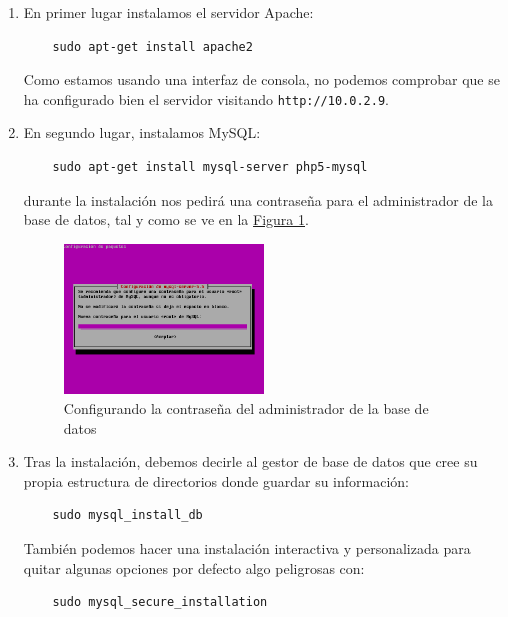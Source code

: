 \documentclass[10pt,a4paper,spanish]{article}
\numberwithin{equation}{section} %
\numberwithin{figure}{section} %
\numberwithin{table}{section} %
\begin{document}
\begin{enumerate}[1.]
    \item En primer lugar instalamos el servidor Apache:
    \begin{verbatim}
    sudo apt-get install apache2
    \end{verbatim}

    Como estamos usando una interfaz de consola, no podemos comprobar que se ha configurado bien el servidor visitando \texttt{http://10.0.2.9}.

    \item En segundo lugar, instalamos MySQL:
    \begin{verbatim}
    sudo apt-get install mysql-server php5-mysql
    \end{verbatim}

    durante la instalación nos pedirá una contraseña para el administrador de la base de datos, tal y como se ve en la \hyperref[passmysql]{Figura \ref*{passmysql}}.
    \begin{figure}[!h]
        \centering
        \includegraphics[width=0.5\textwidth]{15}
        \caption{Configurando la contraseña del administrador de la base de datos}
        \label{passmysql}
    \end{figure}

    \item Tras la instalación, debemos decirle al gestor de base de datos que cree su propia estructura de directorios donde guardar su información:
    \begin{verbatim}
    sudo mysql_install_db
    \end{verbatim}

    También podemos hacer una instalación interactiva y personalizada para quitar algunas opciones por defecto algo peligrosas con:
    \begin{verbatim}
    sudo mysql_secure_installation
    \end{verbatim}


\end{enumerate}
\end{document}
